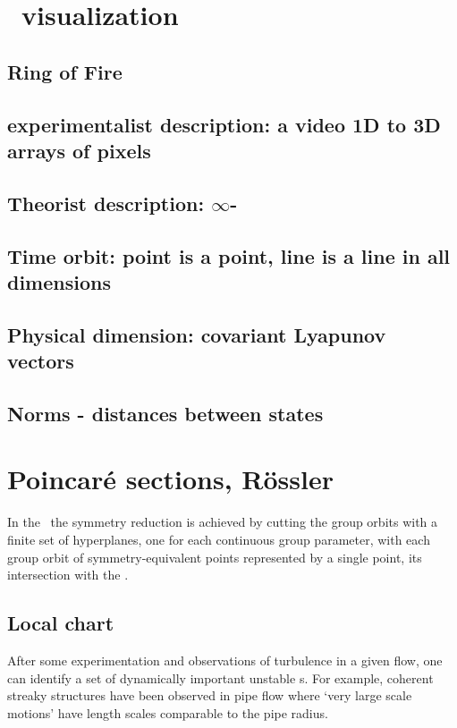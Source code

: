 
\section{\Statesp\ visualization}
\subsection{\cLe}
\subsection{Ring of Fire}
\subsection{experimentalist description: a video 1D to 3D arrays of pixels}
\subsection{Theorist description: $\infty$-\dmn\ \statesp}
\subsection{Time orbit: point is a point, line is a line in all dimensions}
\subsection{Physical dimension: covariant Lyapunov vectors}
\subsection{Norms - distances between states}

\section{Poincar\'e sections, R\"ossler}
\label{s:cut}

In the \mslices\ the symmetry reduction is achieved by cutting the group
orbits with a finite set of hyperplanes, one for each continuous group
parameter, with each group orbit of
symmetry-equivalent points represented by a single point, its
intersection with the \slice.


\subsection{Local chart}
After some experimentation and observations of turbulence in a given
flow, one can identify a set of dynamically important unstable
{\recurrStr s}.  For example, coherent streaky structures have been
observed in pipe flow where `very large scale motions' have
length scales comparable to the pipe radius.

